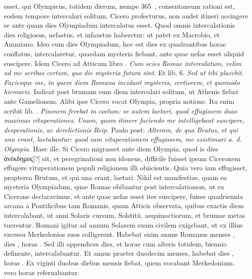 esset, qui Olympicus, totidem dierum, nempe 365~, consentaneum
rationi est, eodem tempore intercalari solitum.
Cicero
profecturus, non audet itineri accingere se ante quam dies Olympiadum
intercalatus esset.
Quod omnis intercalationis dies religiosus,
nefastus, et infaustus haberetur: ut patet ex Macrobio, et Ammiano.
Ideo cum dies Olympiadum, hoc est dies ex quadrantibus horae
conflatus, intercalaretur, quaedam mysteria fiebant, ante quae nefas
esset aliquid suscipere.
Idem Cicero ad Atticum libro .
\textit{Cum scies
Romae intercalatum, velim ad me scribas certum, quo die mysteria
futura sint.}
Et lib. 6.
\textit{Sed ut tibi placebit.}
\textit{Faciesque me, in quem diem
Romana incidant mysteria, certiorem, et quomodo hiemaris.}
Indicat
post brumam eum diem intercalari solitum, ut Athenis fiebat ante
Gamelionem.
Alibi ipse Cicero vocat Olympia, propria notione.
Ita enim scribit lib. .
\textit{Pisonem ferebat in coelum: se autem laetari,
quod effugissem duas maximas vituperationes.}
\textit{Unam, quam itinere
faciendo me intelligebant suscipere, desperationis, ac derelictionis Reip.}
Paulo post: \textit{Alteram, de qua Brutus,
 et qui una erant, laetabantur:
quod eam vituperationem effugissem, me existimari a. d. Olympia.}
Haec
ille.
Si Cicero migrasset ante diem Olympia, quod is dies
 \textgreek{ἀνέκδημος[?]}
sit, et peregrinationi non idoneus, difficile fuisset ipsum Ciceronem
effugere vituperationem populi religionem illi obiicientis.
Quia vero
iam effugisset, propterea Brutum, et qui una erant, laetari.
Nihil est
manifestius, quam ea mysteria Olympiadum, quae Romae obibantur
post intercalationem, ut ex Cicerone declaravimus, et ante quae
nefas esset iter suscipere, fuisse quadriennia arcana a Pontificibus tam
Romanis, quam Atticis observata, quibus exactis diem intercalabant,
ut anni Solaris cursum, Solstitii, aequinoctiorum, et brumae
metas tuerentur.
Romani igitur ad annum Solarem suum civilem exigebant,
ut ex illius excessu Merkedonios suos colligerent.
Habebat
enim annus Romanus menses , dies , horas .
Sed illi appendices
dies, et horae cum alteris totidem, biennio definente, intercalabantur.
Et annus praeter duodecim menses, habebat dies , horas
.
Ex viginti duobus diebus mensis fiebat, quem vocabant
Merkedonium.
 vero horae referuabantur.

